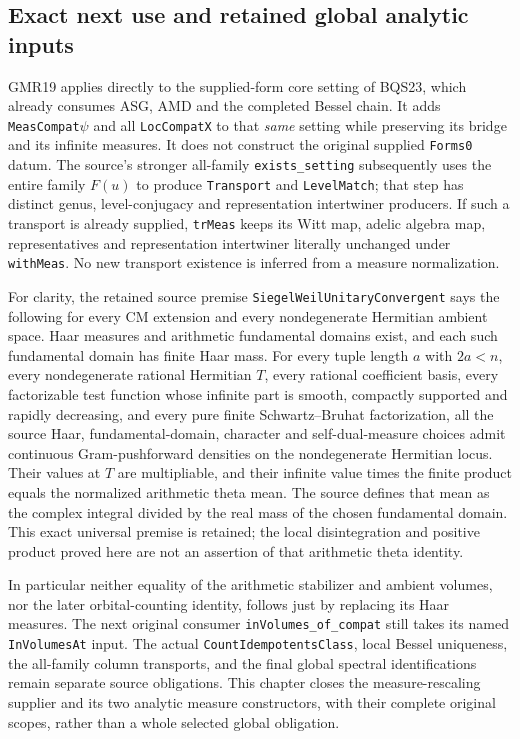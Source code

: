 \documentclass[11pt,a4paper]{article}
\numberwithin{equation}{section}
\theoremstyle{remark}\newtheorem{remark}[theorem]{Remark}
\begin{document}
\subsection{Exact next use and retained global analytic inputs}

GMR19 applies directly to the supplied-form core setting of BQS23,
which already consumes ASG, AMD and the completed Bessel chain.
It adds \texttt{MeasCompat\ensuremath{\psi}} and all \texttt{Loc\allowbreak Compat\allowbreak X} to
that \emph{same} setting while preserving its bridge and its
infinite measures.  It does not construct the original supplied
\texttt{Forms0} datum.  The source's stronger all-family
\texttt{exists\_\allowbreak setting} subsequently uses the entire family
$F(u)$ to produce \texttt{Transport} and \texttt{Level\allowbreak Match};
that step has distinct genus, level-conjugacy and representation
intertwiner producers.  If such a transport is already supplied,
\texttt{tr\allowbreak Meas} keeps its Witt map, adelic algebra map, representatives
and representation intertwiner literally unchanged under
\texttt{with\allowbreak Meas}.  No new transport existence is inferred from a
measure normalization.

For clarity, the retained source premise
\texttt{Siegel\allowbreak Weil\allowbreak Unitary\allowbreak Convergent} says the following for every CM
extension and every nondegenerate Hermitian ambient space.  Haar
measures and arithmetic fundamental domains exist, and each such
fundamental domain has finite Haar mass.  For every tuple length
$a$ with $2a<n$, every nondegenerate rational Hermitian $T$, every
rational coefficient basis, every factorizable test function whose
infinite part is smooth, compactly supported and rapidly decreasing,
and every pure finite Schwartz--Bruhat factorization, all the source
Haar, fundamental-domain, character and self-dual-measure choices
admit continuous Gram-pushforward densities on the nondegenerate
Hermitian locus.  Their values at $T$ are multipliable, and their
infinite value times the finite product equals the normalized
arithmetic theta mean.  The source defines that mean as the complex
integral divided by the real mass of the chosen fundamental domain.
This exact universal premise is retained; the local disintegration
and positive product proved here are not an assertion of that
arithmetic theta identity.

In particular neither equality of the arithmetic stabilizer and
ambient volumes, nor the later orbital-counting identity, follows
just by replacing its Haar measures.  The next original consumer
\texttt{in\allowbreak Volumes\_\allowbreak of\_\allowbreak compat} still takes its named
\texttt{In\allowbreak Volumes\allowbreak At} input.  The actual
\texttt{Count\allowbreak Idempotents\allowbreak Class}, local Bessel uniqueness, the
all-family column transports, and the final global spectral
identifications remain separate source obligations.  This chapter
closes the measure-rescaling supplier and its two analytic measure
constructors, with their complete original scopes, rather than a
whole selected global obligation.
\end{document}
